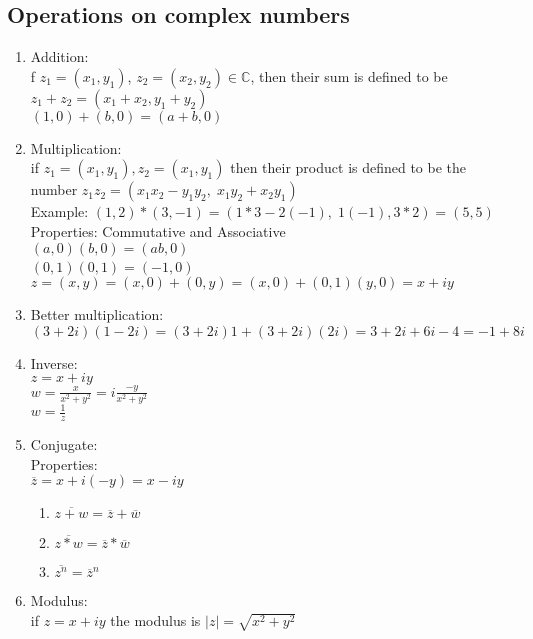 \documentclass{article}
\begin{document}
\subsection{Operations on complex numbers}
\begin{enumerate}
	\item Addition:\\ f $z_1 = (x_1, y_1)$, $z_2 = (x_2, y_2) \in \mathbb{C}$, then their sum is defined to be $z_1 + z_2 = (x_1 + x_2, y_1 + y_2)$ \\
	$(1, 0)+(b, 0) = (a+b, 0)$
	\clearpage
	\item Multiplication:\\ if $z_1 = (x_1, y_1), z_2 = (x_1, y_1)$ then their product is defined to be the number $z_1z_2=(x_1x_2 - y_1y_2,\; x_1y_2 + x_2y_1)$ \\
	Example: $(1,2)*(3, -1) = (1*3 - 2(-1), \; 1(-1), 3*2) = (5, 5)$ \\
	Properties: Commutative and Associative \\
	$(a, 0)(b, 0) = (ab, 0)$ \\
	$(0, 1)(0, 1) = (-1, 0)$\ \\
	$z = (x,y) = (x, 0) + (0, y) = (x, 0) + (0, 1)(y, 0) = x+iy$
	\item Better multiplication: \\
	$(3 + 2i)(1 - 2i) = (3+2i)1 + (3+2i)(2i) = 3+2i+6i-4=-1 + 8i$
	\item Inverse: \\
	$z = x+ iy$ \\
	$w = \frac{x}{x^2 + y^2} = i\frac{-y}{x^2 + y^2}$ \\ 
	$w = \frac{1}{z}$ 	
	\item Conjugate: \\
	Properties: \\
	$\overline{z} = x+i(-y) = x-iy$
	\begin{enumerate}
		\item $\overline{z+w} = \overline{z} + \overline{w}$
		\item $\overline{z*w} = \overline{z} * \overline{w}$
		\item $\overline{z^n} = \overline{z}^n$
	\end{enumerate}
	\item Modulus: \\
	if $z=x+iy$ the modulus is $|z|=\sqrt{x^2 + y^2}$
	
\end{enumerate}
		
\end{document}
